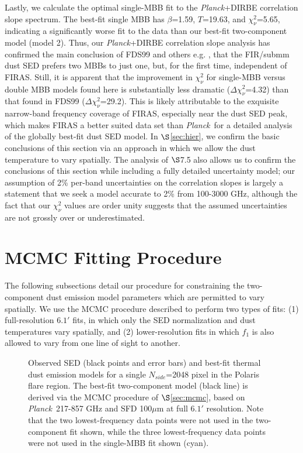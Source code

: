 \documentclass{emulateapj}
\newcommand{\PLANCK}{{\it Planck}}
\begin{document}
Lastly, we calculate the optimal single-MBB fit to the \PLANCK+DIRBE 
correlation slope spectrum. The best-fit single MBB has $\beta$=1.59, 
$T$=19.63, and $\chi^2_{\nu}$=5.65, indicating a significantly worse fit to the
data than our best-fit two-component model (model 2). Thus, our \PLANCK+DIRBE 
correlation slope analysis has confirmed the main conclusion of FDS99 and 
others e.g. \cite{reach95}, that the FIR/submm dust SED prefers two MBBs to 
just one, but, for the first time, independent of FIRAS. Still, it is apparent 
that the improvement in $\chi^2_{\nu}$ for single-MBB versus double MBB models 
found here is substantially less dramatic ($\Delta\chi^2_{\nu}$=4.32) than that
found in FDS99 ($\Delta\chi^2_{\nu}$=29.2). This is likely attributable to the 
exquisite narrow-band frequency coverage of FIRAS, especially near the dust SED
peak, which makes FIRAS a better suited data set than \PLANCK~for a detailed 
analysis of the globally best-fit dust SED model. In $\S$\ref{sec:hier}, we
confirm the basic conclusions of this section via an approach in which we 
allow the dust temperature to vary spatially. The analysis of $\S$7.5 also
allows us to confirm the conclusions of this section while including a 
fully detailed uncertainty model; our assumption of 2\% per-band uncertainties 
on the correlation slopes is largely a statement that we seek a model
accurate to 2\% from 100-3000 GHz, although the fact that our $\chi^2_{\nu}$ 
values are order unity suggests that the assumed uncertainties are not grossly 
over or underestimated.

\section{MCMC Fitting Procedure}
\label{sec:fitting}

The following subsections detail our procedure for constraining the 
two-component dust emission model parameters which are permitted to vary
spatially. We use the MCMC procedure described to perform two types of fits: 
(1) full-resolution $6.1'$ fits, in which only  the SED normalization and dust 
temperatures vary spatially, and (2) lower-resolution fits in which $f_1$ is 
also allowed to vary from one line of sight to another.

\begin{figure}
\begin{center}
\caption{\label{fig:sed} Observed SED (black points and error bars) and 
best-fit thermal dust emission models for a single $N_{side}$=2048 pixel in the
Polaris flare region. The best-fit two-component model (black line) is derived 
via the MCMC procedure of $\S$\ref{sec:mcmc}, based on \PLANCK~217-857 GHz and 
SFD 100$\mu$m at full $6.1'$ resolution. Note that the two lowest-frequency 
data points were not used in the two-component fit shown, while the three 
lowest-frequency data points were not used in the \cite{planckdust} single-MBB 
fit shown (cyan).}
\end{center}
\end{figure}
\end{document}
